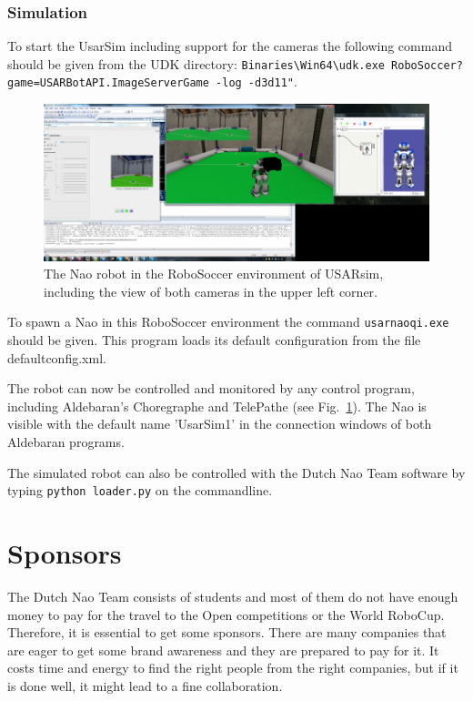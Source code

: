 \documentclass[a4paper]{article}
\begin{document}
\subsubsection{Simulation}
To start the UsarSim including support for the cameras the following command should be given from the UDK directory: \texttt{Binaries\textbackslash Win64\textbackslash udk.exe RoboSoccer?game=USARBotAPI.ImageServerGame -log -d3d11"}.

\begin{figure}[htb]        
\centering\includegraphics[width=.95\columnwidth]{NaoWithTwoCamerasInSoccerWorld.png}
\caption{The  Nao robot in the RoboSoccer environment of USARsim, including the view of both cameras in the upper left corner.}\label{fig:nao_robosoccer}
\end{figure}

To spawn a Nao in this RoboSoccer environment the command \texttt{usarnaoqi.exe} should be given. This program loads its default configuration from the file defaultconfig.xml.

The robot can now be controlled and monitored by any control program, including Aldebaran's Choregraphe and TelePathe (see Fig.~\ref{fig:nao_robosoccer}). The Nao is visible with the default name 'UsarSim1' in the connection windows of both Aldebaran programs.

The simulated robot can also be controlled with the Dutch Nao Team software by typing \texttt{python loader.py} on the commandline.

\section{Sponsors}
The Dutch Nao Team consists of students and most of them do not have enough money to pay for the travel to the Open competitions or the World RoboCup. Therefore, it is essential to get some sponsors. There are many companies that are eager to get some brand awareness and they are prepared to pay for it. It costs time and energy to find the right people from the right companies, but if it is done well, it might lead to a fine collaboration.
\end{document}
